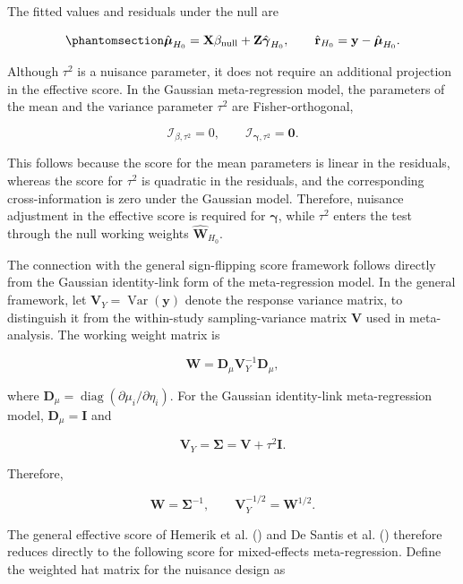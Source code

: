 \documentclass[
  man,
  longtable,
  nolmodern,
  notxfonts,
  notimes,
  colorlinks=true,linkcolor=blue,citecolor=blue,urlcolor=blue]{apa7}
\begin{document}
The fitted values and residuals under the null are

\begin{equation}\phantomsection\label{eq-null-residuals}{
\hat{\boldsymbol{\mu}}_{H_0}
=
\mathbf{X}\beta_{\mathrm{null}}
+
\mathbf{Z}\hat{\boldsymbol{\gamma}}_{H_0},
\qquad
\hat{\mathbf{r}}_{H_0}
=
\mathbf{y}
-
\hat{\boldsymbol{\mu}}_{H_0}.
}\end{equation}

Although \(\tau^2\) is a nuisance parameter, it does not require an
additional projection in the effective score. In the Gaussian
meta-regression model, the parameters of the mean and the variance
parameter \(\tau^2\) are Fisher-orthogonal,

\[
\mathcal{I}_{\beta,\tau^2}=0,
\qquad
\mathcal{I}_{\boldsymbol{\gamma},\tau^2}=\mathbf{0}.
\]

This follows because the score for the mean parameters is linear in the
residuals, whereas the score for \(\tau^2\) is quadratic in the
residuals, and the corresponding cross-information is zero under the
Gaussian model. Therefore, nuisance adjustment in the effective score is
required for \(\boldsymbol{\gamma}\), while \(\tau^2\) enters the test
through the null working weights \(\widehat{\mathbf{W}}_{H_0}\).

The connection with the general sign-flipping score framework follows
directly from the Gaussian identity-link form of the meta-regression
model. In the general framework, let
\(\mathbf{V}_Y=\operatorname{Var}(\mathbf{y})\) denote the response
variance matrix, to distinguish it from the within-study
sampling-variance matrix \(\mathbf{V}\) used in meta-analysis. The
working weight matrix is

\[
\mathbf{W}
=
\mathbf{D}_{\mu}
\mathbf{V}_Y^{-1}
\mathbf{D}_{\mu},
\]

where
\(\mathbf{D}_{\mu}=\operatorname{diag}(\partial\mu_i/\partial\eta_i)\).
For the Gaussian identity-link meta-regression model,
\(\mathbf{D}_{\mu}=\mathbf{I}\) and

\[
\mathbf{V}_Y
=
\boldsymbol{\Sigma}
=
\mathbf{V}+\tau^2\mathbf{I}.
\]

Therefore,

\[
\mathbf{W}
=
\boldsymbol{\Sigma}^{-1},
\qquad
\mathbf{V}_Y^{-1/2}
=
\mathbf{W}^{1/2}.
\]

The general effective score of Hemerik et al.
() and De Santis et al.
() therefore reduces directly to
the following score for mixed-effects meta-regression. Define the
weighted hat matrix for the nuisance design as
\end{document}
